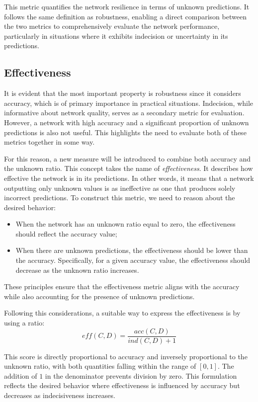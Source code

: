 This metric quantifies the network resilience in terms of unknown predictions. It follows the same definition as robustness, enabling a direct comparison between the two metrics to comprehensively evaluate the network performance, particularly in situations where it exhibits indecision or uncertainty in its predictions.

\subsection{Effectiveness}

It is evident that the most important property is robustness since it considers accuracy, which is of primary importance in practical situations. Indecision, while informative about network quality, serves as a secondary metric for evaluation. However, a network with high accuracy and a significant proportion of unknown predictions is also not useful. This highlights the need to evaluate both of these metrics together in some way.

For this reason, a new measure will be introduced to combine both accuracy and the unknown ratio. This concept takes the name of \textit{effectiveness}. It describes how effective the network is in its predictions. In other words, it means that a network outputting only unknown values is as ineffective as one that produces solely incorrect predictions. To construct this metric, we need to reason about the desired behavior:

\begin{itemize}
	\item When the network has an unknown ratio equal to zero, the effectiveness should reflect the accuracy value;
	\item When there are unknown predictions, the effectiveness should be lower than the accuracy. Specifically, for a given accuracy value, the effectiveness should decrease as the unknown ratio increases.
\end{itemize}

These principles ensure that the effectiveness metric aligns with the accuracy while also accounting for the presence of unknown predictions.

Following this considerations, a suitable way to express the effectiveness is by using a ratio:
\[
	eff(C,D) = \frac{acc(C,D)}{ind(C,D) + 1}
\]

This score is directly proportional to accuracy and inversely proportional to the unknown ratio, with both quantities falling within the range of $[0,1]$. The addition of $1$ in the denominator prevents division by zero. This formulation reflects the desired behavior where effectiveness is influenced by accuracy but decreases as indecisiveness increases. 

